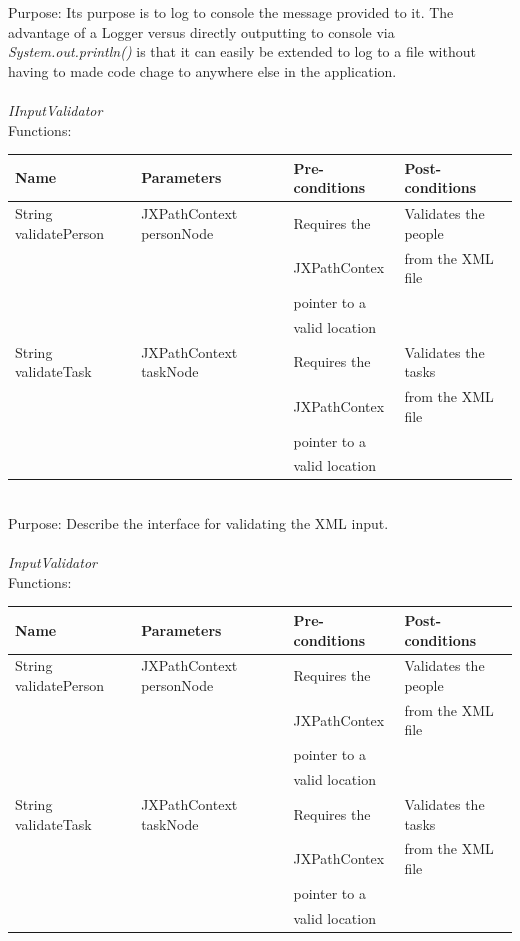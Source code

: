Purpose: Its purpose is to log to console the message provided to it. The advantage of a Logger versus directly outputting to console via \emph{System.out.println()} is that it can easily be extended to log to a file without having to made code chage to anywhere else in the application.
\\
\\

\emph{IInputValidator}\\
Functions:\\
\begin{tabular}{| l | l | l | l |}
\hline
Name & Parameters & Pre-conditions & Post-conditions\\
\hline
	String validatePerson	 	& JXPathContext personNode       & Requires the 		& Validates the people \\	
					& 				       & JXPathContex 		& from the XML file \\	
					& 				       & pointer to a 		& \\
					& 				       & valid location 		& \\
\hline						
	String validateTask		& JXPathContext taskNode           & Requires the       	 & Validates the tasks \\
					& 				       & JXPathContex 		& from the XML file \\	
					& 				       & pointer to a 		& \\
					& 				       & valid location 		&
\\
\hline
\end{tabular}
\\

Purpose: Describe the interface for validating the XML input.
\\
\\
\emph{InputValidator}\\
Functions:\\
\begin{tabular}{| l | l | l | l |}
\hline
Name & Parameters & Pre-conditions & Post-conditions\\
\hline
	String validatePerson	 	& JXPathContext personNode       & Requires the 		& Validates the people \\	
					& 				       & JXPathContex 		& from the XML file \\	
					& 				       & pointer to a 		& \\
					& 				       & valid location 		& \\
\hline						
	String validateTask		& JXPathContext taskNode           & Requires the       	 & Validates the tasks \\
					& 				       & JXPathContex 		& from the XML file \\	
					& 				       & pointer to a 		& \\
					& 				       & valid location 		&
\\
\hline
\end{tabular}
\\

